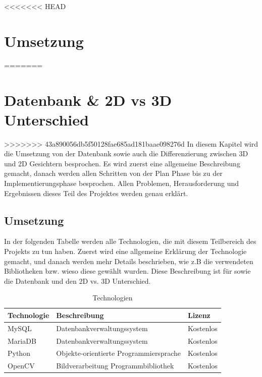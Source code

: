 <<<<<<< HEAD
\chapter{Umsetzung }
=======
\chapter{Datenbank \& 2D vs 3D Unterschied}
>>>>>>> 43a890056db5f50128fae685ad181baae098276d
\label{\docname}
In diesem Kapitel wird die Umsetzung von der Datenbank sowie auch die Differenzierung zwischen 3D und 2D Gesichtern besprochen. Es wird zuerst eine allgemeine Beschreibung gemacht, danach werden allen Schritten von der Plan Phase bis zu der Implementierungsphase besprochen. Allen Problemen, Herausforderung und Ergebnissen dieses Teil des Projektes werden genau erklärt.
\section{Umsetzung}
In der folgenden Tabelle werden alle Technologien, die mit diesem Teilbereich des Projekts  zu tun haben. Zuerst wird eine allgemeine Erklärung der Technologie gemacht, und danach werden mehr Details beschrieben, wie z.B die verwendeten Bibliotheken bzw. wieso diese gewählt wurden. Diese Beschreibung ist für sowie die Datenbank und den 2D vs. 3D Unterschied.

\begin{table}[ht]
	\centering
	\begin{tabular}{ |l|l|l| } 
		\hline		
		Technologie & Beschreibung & Lizenz \\ 
		\hline
		MySQL & Datenbankverwaltungssystem & Kostenlos \\ 
		\hline
		MariaDB & Datenbankverwaltungssystem & Kostenlos \\
		\hline 
		Python & Objekte-orientierte Programmiersprache & Kostenlos \\
		\hline 
		OpenCV &  Bildverarbeitung Programmbibliothek  & Kostenlos \\ 
		\hline
	\end{tabular}
	\caption{Technologien}
	\label{table:tech}
\end{table}
